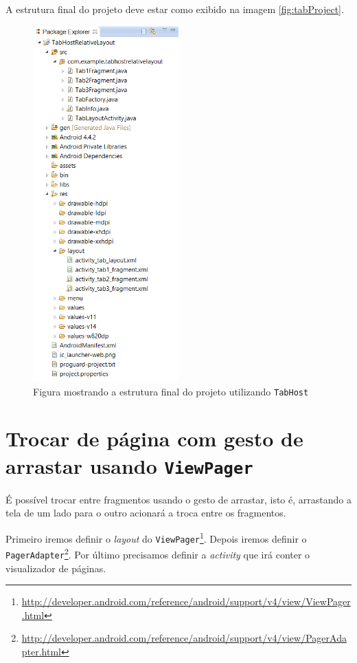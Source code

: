 \documentclass[a4paper,12pt,brazil,oneside]{book}
\begin{document}
	A estrutura final do projeto deve estar como exibido na imagem \autoref{fig:tabProject}.
	
	\begin{figure}[H]
	  \centering
	  \includegraphics[width=0.5\textwidth]{figuras/design/tab-project.png}
	  \caption{Figura mostrando a estrutura final do projeto utilizando \texttt{TabHost}}
	  \label{fig:e18}
	\end{figure}
	
	
\section{Trocar de página com gesto de arrastar usando \texttt{ViewPager}}

	É possível trocar entre fragmentos usando o gesto de arrastar, isto é, arrastando a tela de um lado para o outro acionará a troca entre os fragmentos. 
	
	Primeiro iremos definir o \emph{layout} do \texttt{ViewPager}\footnote{\href{http://developer.android.com/reference/android/support/v4/view/ViewPager.html}{http://developer.android.com/reference/android/support/v4/view/ViewPager.html}}. Depois iremos definir o \texttt{PagerAdapter}\footnote{\href{http://developer.android.com/reference/android/support/v4/view/PagerAdapter.html}{http://developer.android.com/reference/android/support/v4/view/PagerAdapter.html}}. Por último precisamos definir a \emph{activity} que irá conter o visualizador de páginas. 
	
\end{document}
